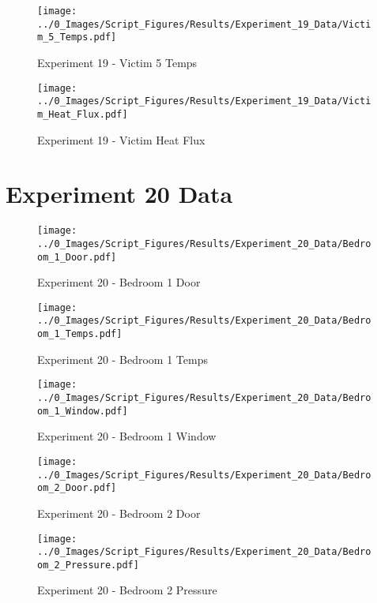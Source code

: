 	\clearpage

	\begin{figure}[H]
		\centering
		\texttt{[image: ../0\_Images/Script\_Figures/Results/Experiment\_19\_Data/Victim\_5\_Temps.pdf]}
		\caption[]{Experiment 19 - Victim 5 Temps}
	\end{figure}
 

	\begin{figure}[H]
		\centering
		\texttt{[image: ../0\_Images/Script\_Figures/Results/Experiment\_19\_Data/Victim\_Heat\_Flux.pdf]}
		\caption[]{Experiment 19 - Victim Heat Flux}
	\end{figure}
 
	\clearpage

\clearpage		\large
\section{Experiment 20 Data} \label{App:Exp20Results} 

	\begin{figure}[H]
		\centering
		\texttt{[image: ../0\_Images/Script\_Figures/Results/Experiment\_20\_Data/Bedroom\_1\_Door.pdf]}
		\caption[]{Experiment 20 - Bedroom 1 Door}
	\end{figure}
 

	\begin{figure}[H]
		\centering
		\texttt{[image: ../0\_Images/Script\_Figures/Results/Experiment\_20\_Data/Bedroom\_1\_Temps.pdf]}
		\caption[]{Experiment 20 - Bedroom 1 Temps}
	\end{figure}
 
	\clearpage

	\begin{figure}[H]
		\centering
		\texttt{[image: ../0\_Images/Script\_Figures/Results/Experiment\_20\_Data/Bedroom\_1\_Window.pdf]}
		\caption[]{Experiment 20 - Bedroom 1 Window}
	\end{figure}
 

	\begin{figure}[H]
		\centering
		\texttt{[image: ../0\_Images/Script\_Figures/Results/Experiment\_20\_Data/Bedroom\_2\_Door.pdf]}
		\caption[]{Experiment 20 - Bedroom 2 Door}
	\end{figure}
 
	\clearpage

	\begin{figure}[H]
		\centering
		\texttt{[image: ../0\_Images/Script\_Figures/Results/Experiment\_20\_Data/Bedroom\_2\_Pressure.pdf]}
		\caption[]{Experiment 20 - Bedroom 2 Pressure}
	\end{figure}
 


